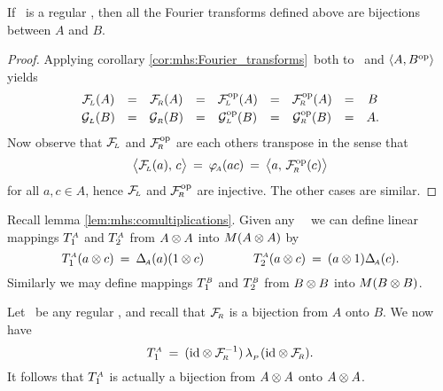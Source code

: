 \begin{lemma_sec} \label{lem:mhs:Fourier_transforms:bijections}
If\/ \pairAB\ is a regular \mhs, then all the Fourier transforms
defined above are bijections between $A$ and\/ $B$.
\end{lemma_sec}

\begin{proof}
Applying corollary \ref{cor:mhs:Fourier_transforms}\ both to
\pairAB\ and $\langle A,B^{\rm op} \rangle$ yields
$$\begin{array}{ccccccccc}
  \FL(A) &=& \FR(A) &=& \FL\op(A) &=& \FR\op(A) &=& B  \\
  \GL(B) &=& \GR(B) &=& \GL\op(B) &=& \GR\op(B) &=& A. \vertL
  \end{array} $$
Now observe that $\mathcal{F}_{\!\scriptscriptstyle L}$ and $\mathcal{F}_{\!\scriptscriptstyle R}^{\rm op}$ are each others transpose
in the sense that
$$  \pairM{\FL(a)}{c} \:=\: \phiA(ac) \:=\:  \pairM{a}{\FR\op(c)}  $$
for all $a,c \in A$, hence $\mathcal{F}_{\!\scriptscriptstyle L}$ and $\mathcal{F}_{\!\scriptscriptstyle R}^{\rm op}$ are injective.
The other cases are similar.
\end{proof}
\vspace{2ex}


Recall lemma \ref{lem:mhs:comultiplications}\@.
Given any \mhs\ \pairAB\ we can define linear mappings
$T_{1}^{\scriptscriptstyle A}$ and $T_{2}^{\scriptscriptstyle A}$ from $A \otimes A$ into $M(A \otimes A)$ by
$$ T_{1}^{\scriptscriptstyle A}(a \otimes c) \:=\: \Delta_{\scriptscriptstyle \! A}(a)(1 \otimes c)
            \hspace{4em}
   T_{2}^{\scriptscriptstyle A}(a \otimes c) \:=\: (a \otimes 1) \Delta_{\scriptscriptstyle \! A}(c).  $$
Similarly we may define mappings $T_{1}^{\scriptscriptstyle B}$ and $T_{2}^{\scriptscriptstyle B}$
from $B \otimes B$ into $M(B \otimes B)$.


\begin{lemma_sec} \label{lem:mhs:TA1}
Let\/ \pairAB\ be any regular \mhs, and
recall that\/ $\mathcal{F}_{\!\scriptscriptstyle R}$ is a bijection from $A$ onto\/ $B$.
We now have
$$   T_{1}^{\scriptscriptstyle A} \:=\: (\mbox{\rm id} \otimes \mathcal{F}_{\!\scriptscriptstyle R}^{-1}) \,\lambda_{_P\!}\, (\mbox{\rm id} \otimes \mathcal{F}_{\!\scriptscriptstyle R}). $$
It follows that\/ $T_{1}^{\scriptscriptstyle A}$ is actually a bijection from\/ $A \otimes A$ onto\/ $A \otimes A$.
\end{lemma_sec}

